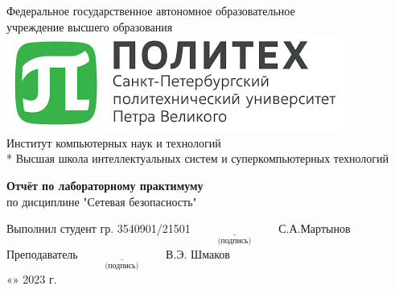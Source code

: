 \begin{titlepage}

\begin{center} %
Федеральное государственное автономное образовательное \\
учреждение высшего образования \\[0.4cm]
\includegraphics[scale=0.8]{res/SPbPU-logo} \\[0.4cm]
Институт компьютерных наук и технологий \\*
Высшая школа интеллектуальных систем и суперкомпьютерных технологий
\end{center}

\vspace{3cm}

\begin{center} %
\textbf{Отчёт по лабораторному практимуму}\\
по дисциплине "Сетевая безопасность" \\
\end{center}

\vspace{3.5cm}
 
\begin{flushleft}
Выполнил студент гр. 3540901/21501 \hspace{3cm} $\underset{\text{(подпись)}}{\underline{\hspace{3cm}}}$ С.А.Мартынов\\[0.5cm]
Преподаватель \hspace{7.25cm} $\underset{\text{(подпись)}}{\underline{\hspace{3cm}}}$ В.Э. Шмаков\\[0.5cm]
\hspace{10.2cm} «\underline{\hspace{1cm}}» \underline{\hspace{3cm}} 2023 г.
\end{flushleft}


\end{titlepage}
